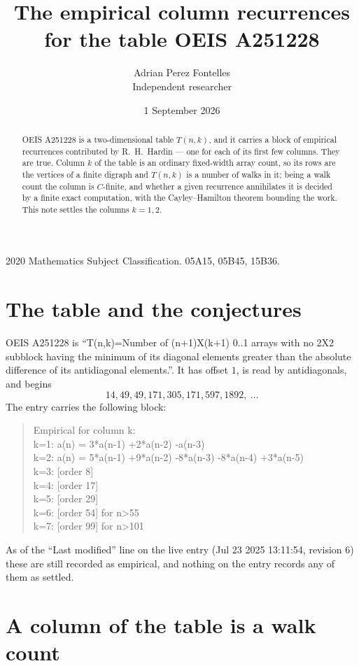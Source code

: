 \documentclass[11pt,a4paper]{article}
\title{The empirical column recurrences for the table OEIS A251228}
\author{Adrian Perez Fontelles\\ \small Independent researcher}
\date{1 September 2026}
\theoremstyle{plain}
\theoremstyle{definition}
\begin{document}
\maketitle

\begin{abstract}
OEIS A251228 is a two-dimensional table $T(n,k)$, and it carries a block of empirical
recurrences contributed by R.~H.~Hardin --- one for each of its first few columns. They are
true. Column $k$ of the table is an ordinary fixed-width array count, so its rows are the
vertices of a finite digraph and $T(n,k)$ is a number of walks in it; being a walk count the
column is $C$-finite, and whether a given recurrence annihilates it is decided by a finite
exact computation, with the Cayley--Hamilton theorem bounding the work. This note settles the
columns $k=1, 2$.
\end{abstract}

\noindent\small 2020 Mathematics Subject Classification. 05A15, 05B45, 15B36.\normalsize

\section{The table and the conjectures}

OEIS A251228 is ``T(n,k)=Number of (n+1)X(k+1) 0..1 arrays with no 2X2 subblock having the minimum of its diagonal elements greater than the absolute difference of its antidiagonal elements.''. It has offset $1$, is
read by antidiagonals, and begins
\[
14, 49, 49, 171, 305, 171, 597, 1892,\ \dots
\]
The entry carries the following block:
\begin{quote}\small
Empirical for column k:\\
k=1: a(n) = 3*a(n-1) +2*a(n-2) -a(n-3)\\
k=2: a(n) = 5*a(n-1) +9*a(n-2) -8*a(n-3) -8*a(n-4) +3*a(n-5)\\
k=3: [order 8]\\
k=4: [order 17]\\
k=5: [order 29]\\
k=6: [order 54] for n>55\\
k=7: [order 99] for n>101\\
\end{quote}
As of the ``Last modified'' line on the live entry (Jul 23 2025 13:11:54, revision 6) these are still
recorded as empirical, and nothing on the entry records any of them as settled.

\section{A column of the table is a walk count}
\end{document}
